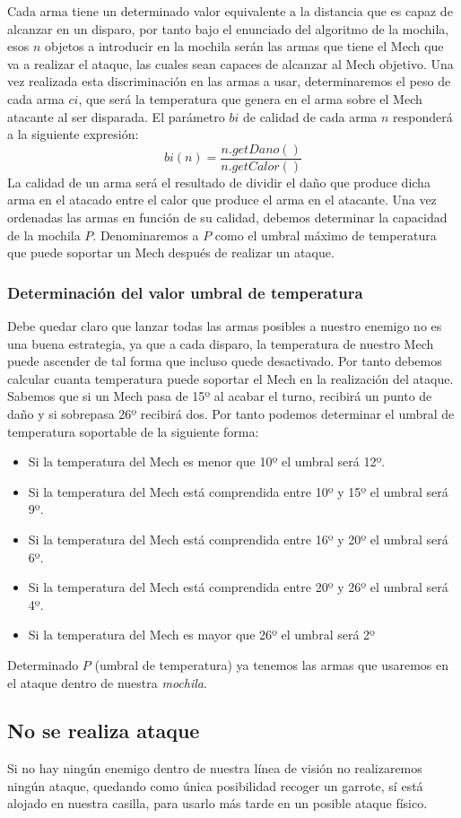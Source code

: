 \documentclass[a4paper,12pt,oneside]{book}
\begin{document}
Cada arma tiene un determinado valor equivalente a la distancia que es capaz de alcanzar en un disparo, por tanto bajo el enunciado del algoritmo de la mochila,  esos $n$ objetos a introducir en la mochila serán las armas que tiene el Mech que va a realizar el ataque, las cuales sean capaces de alcanzar al Mech objetivo. Una vez realizada esta discriminación en las armas a usar, determinaremos el peso de cada arma $ci$, que será la temperatura que genera en el arma sobre el Mech atacante al ser disparada. El parámetro $bi$ de calidad de cada arma $n$ responderá a la siguiente expresión:
$$ bi(n) = \frac{n.getDano()}{n.getCalor()}$$
La calidad de un arma será el resultado de dividir el daño que produce dicha arma en el atacado entre el calor que produce el arma en el atacante. Una vez ordenadas las armas en función de su calidad, debemos determinar la capacidad de la mochila $P$. Denominaremos a $P$ como el umbral máximo de temperatura que puede soportar un Mech después de realizar un ataque.
\subsubsection*{Determinación del valor umbral de temperatura}
Debe quedar claro que lanzar todas las armas posibles a nuestro enemigo no es una buena estrategia, ya que a cada disparo, la temperatura de nuestro Mech puede ascender de tal forma que incluso quede desactivado. Por tanto debemos calcular cuanta temperatura puede soportar el Mech en la realización del ataque. Sabemos que si un Mech pasa de 15º al acabar el turno, recibirá un punto de daño y si sobrepasa 26º recibirá dos. Por tanto podemos determinar el umbral de temperatura soportable de la siguiente forma:
\begin{itemize}
\item Si la temperatura del Mech es menor que 10º el umbral será 12º.
\item Si la temperatura del Mech está comprendida entre 10º y 15º el umbral será 9º.
\item Si la temperatura del Mech está comprendida entre 16º y 20º el umbral será 6º.
\item Si la temperatura del Mech está comprendida entre 20º y 26º el umbral será 4º.
\item Si la temperatura del Mech es mayor que 26º el umbral será 2º
\end{itemize}
Determinado $P$ (umbral de temperatura) ya tenemos las armas que usaremos en el ataque dentro de nuestra \textit{mochila}.
\subsection*{No se realiza ataque}
Si no hay ningún enemigo dentro de nuestra línea de visión no realizaremos ningún ataque, quedando como única posibilidad recoger un garrote, sí está alojado en nuestra casilla, para usarlo más tarde en un posible ataque físico.
\end{document}
